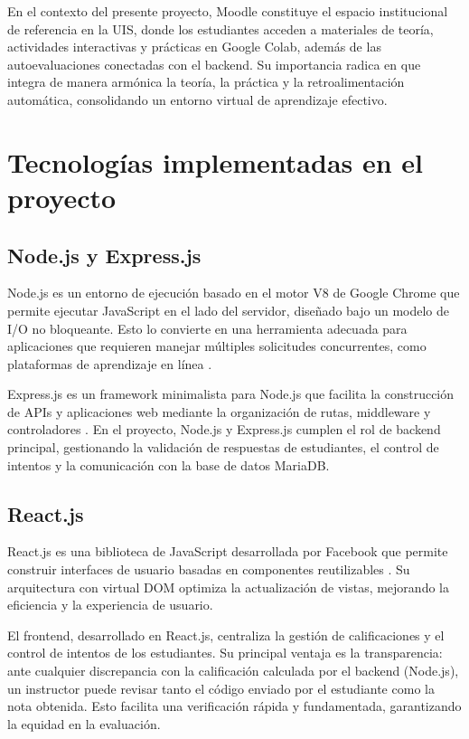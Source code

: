 \documentclass[letter,oneside,12pt,spanish]{report}
\begin{document}
En el contexto del presente proyecto, Moodle constituye el espacio institucional de referencia en la UIS, donde los estudiantes acceden a materiales de teoría, actividades interactivas y prácticas en Google Colab, además de las autoevaluaciones conectadas con el backend. Su importancia radica en que integra de manera armónica la teoría, la práctica y la retroalimentación automática, consolidando un entorno virtual de aprendizaje efectivo.


\section{Tecnologías implementadas en el proyecto}

\subsection{Node.js y Express.js}

Node.js es un entorno de ejecución basado en el motor V8 de Google Chrome que permite ejecutar JavaScript en el lado del servidor, diseñado bajo un modelo de I/O no bloqueante. Esto lo convierte en una herramienta adecuada para aplicaciones que requieren manejar múltiples solicitudes concurrentes, como plataformas de aprendizaje en línea \parencite{tilkov2010}.

Express.js es un framework minimalista para Node.js que facilita la construcción de APIs y aplicaciones web mediante la organización de rutas, middleware y controladores \parencite{brown2019}. En el proyecto, Node.js y Express.js cumplen el rol de backend principal, gestionando la validación de respuestas de estudiantes, el control de intentos y la comunicación con la base de datos MariaDB.

\subsection{React.js}

React.js es una biblioteca de JavaScript desarrollada por Facebook que permite construir interfaces de usuario basadas en componentes reutilizables \parencite{banks2017}. Su arquitectura con virtual DOM optimiza la actualización de vistas, mejorando la eficiencia y la experiencia de usuario.

El frontend, desarrollado en React.js, centraliza la gestión de calificaciones y el control de intentos de los estudiantes. Su principal ventaja es la transparencia: ante cualquier discrepancia con la calificación calculada por el backend (Node.js), un instructor puede revisar tanto el código enviado por el estudiante como la nota obtenida. Esto facilita una verificación rápida y fundamentada, garantizando la equidad en la evaluación.
\end{document}
